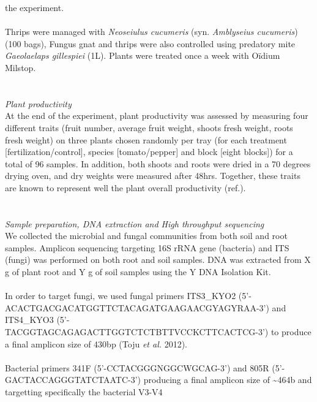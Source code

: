 \documentclass[11pt,]{article}
\begin{document}
the experiment.\\
\hspace*{0.333em}\\
Thrips were managed with \emph{Neoseiulus cucumeris} (syn.
\emph{Amblyseius cucumeris}) (100 bags), Fungus gnat and thrips were
also controlled using predatory mite \emph{Gaeolaelaps gillespiei} (1L).
Plants were treated once a week with Oïdium Milstop.\\
\hspace*{0.333em}\\
\hspace*{0.333em}\\
\emph{Plant productivity}\\
At the end of the experiment, plant productivity was assessed by
measuring four different traits (fruit number, average fruit weight,
shoots fresh weight, roots fresh weight) on three plants chosen randomly
per tray (for each treatment {[}fertilization/control{]}, species
{[}tomato/pepper{]} and block {[}eight blocks{]}) for a total of 96
samples. In addition, both shoots and roots were dried in a 70 degrees
drying oven, and dry weights were measured after 48hrs. Together, these
traits are known to represent well the plant overall productivity
(ref.).\\
\hspace*{0.333em}\\
\hspace*{0.333em}\\
\emph{Sample preparation, DNA extraction and High throughput
sequencing}\\
We collected the microbial and fungal communities from both soil and
root samples. Amplicon sequencing targeting 16S rRNA gene (bacteria) and
ITS (fungi) was performed on both root and soil samples. DNA was
extracted from X g of plant root and Y g of soil samples using the Y DNA
Isolation Kit.\\
\hspace*{0.333em}\\
In order to target fungi, we used fungal primers ITS3\_KYO2
(5'-ACACTGACGACATGGTTCTACAGATGAAGAACGYAGYRAA-3') and ITS4\_KYO3
(5'-TACGGTAGCAGAGACTTGGTCTCTBTTVCCKCTTCACTCG-3') to produce a final
amplicon size of 430bp (Toju \emph{et al.} 2012).\\
\hspace*{0.333em}\\
Bacterial primers 341F (5'-CCTACGGGNGGCWGCAG-3') and 805R
(5'-GACTACCAGGGTATCTAATC-3') producing a final amplicon size of
\textasciitilde{}464b and targetting specifically the bacterial V3-V4
\end{document}
